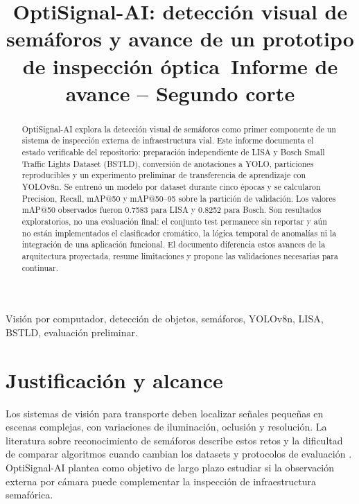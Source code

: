 \documentclass[conference]{IEEEtran}
\begin{document}
\title{OptiSignal-AI: detección visual de semáforos y avance de un prototipo de inspección óptica\
\vspace{0.15cm}\large Informe de avance -- Segundo corte}

\author{
}

\maketitle

\begin{abstract}
OptiSignal-AI explora la detección visual de semáforos como primer componente de un sistema de inspección externa de infraestructura vial. Este informe documenta el estado verificable del repositorio: preparación independiente de LISA y Bosch Small Traffic Lights Dataset (BSTLD), conversión de anotaciones a YOLO, particiones reproducibles y un experimento preliminar de transferencia de aprendizaje con YOLOv8n. Se entrenó un modelo por dataset durante cinco épocas y se calcularon Precision, Recall, mAP@50 y mAP@50--95 sobre la partición de validación. Los valores mAP@50 observados fueron 0.7583 para LISA y 0.8252 para Bosch. Son resultados exploratorios, no una evaluación final: el conjunto test permanece sin reportar y aún no están implementados el clasificador cromático, la lógica temporal de anomalías ni la integración de una aplicación funcional. El documento diferencia estos avances de la arquitectura proyectada, resume limitaciones y propone las validaciones necesarias para continuar.
\end{abstract}

\begin{IEEEkeywords}
Visión por computador, detección de objetos, semáforos, YOLOv8n, LISA, BSTLD, evaluación preliminar.
\end{IEEEkeywords}

\section{Justificación y alcance}
Los sistemas de visión para transporte deben localizar señales pequeñas en escenas complejas, con variaciones de iluminación, oclusión y resolución. La literatura sobre reconocimiento de semáforos describe estos retos y la dificultad de comparar algoritmos cuando cambian los datasets y protocolos de evaluación \cite{jensen2016,philipsen2015,behrendt2017,fernandez2018,pavlitska2023}. OptiSignal-AI plantea como objetivo de largo plazo estudiar si la observación externa por cámara puede complementar la inspección de infraestructura semafórica.
\end{document}
